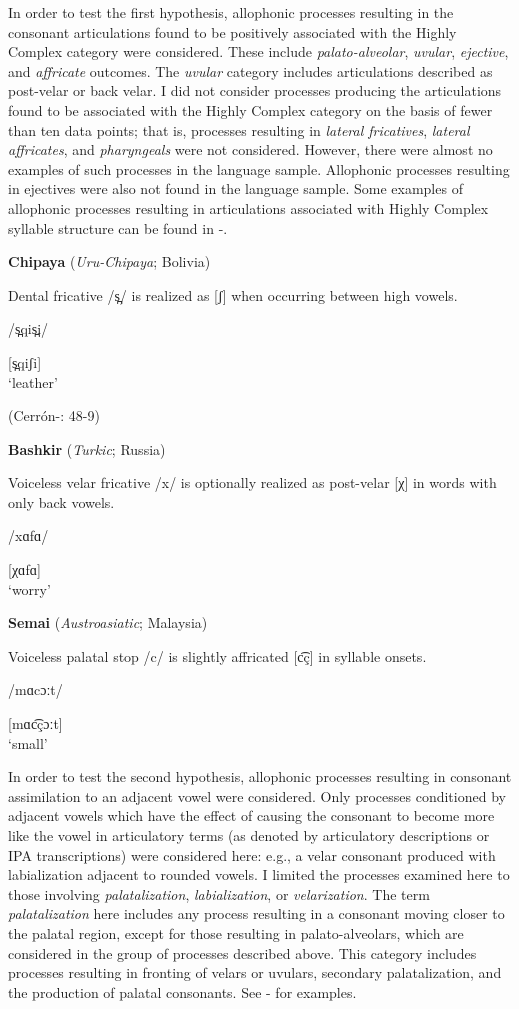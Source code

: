   In order to test the first hypothesis, allophonic processes resulting in the consonant articulations found to be positively associated with the Highly Complex category were considered. These include \textit{palato-alveolar}, \textit{uvular}, \textit{ejective}, and \textit{affricate} outcomes. The \textit{uvular} category includes articulations described as post-velar or back velar. I did not consider processes producing the articulations found to be associated with the Highly Complex category on the basis of fewer than ten data points; that is, processes resulting in \textit{lateral fricatives}, \textit{lateral affricates}, and \textit{pharyngeals} were not considered. However, there were almost no examples of such processes in the language sample. Allophonic processes resulting in ejectives were also not found in the language sample. Some examples of allophonic processes resulting in articulations associated with Highly Complex syllable structure can be found in -.

\ea\label{ex:7.3}
  \textbf{Chipaya} (\textit{Uru-Chipaya}; Bolivia)

Dental fricative /s̪/ is realized as [ʃ] when occurring between high vowels.

/s̪qis̪i/

[s̪qiʃi]\\
\glt ‘leather’

(Cerrón-\citealt{Palomino2006}: 48-9)
\z

\ea\label{ex:7.4}
  \textbf{Bashkir} (\textit{Turkic}; Russia)

Voiceless velar fricative /x/ is optionally realized as post-velar [χ] in words with only back vowels.

/xɑfɑ/

[χɑfɑ]\\
\glt ‘worry’
\citep[11]{Poppe1964}
\z

\ea\label{ex:7.5}
  \textbf{Semai} (\textit{Austroasiatic}; Malaysia)

Voiceless palatal stop /c/ is slightly affricated [c͡ç] in syllable onsets.

/mɑcɔːt/

[mɑc͡çɔːt]\\
\glt ‘small’
\citep[5]{Philips2007}
\z

  In order to test the second hypothesis, allophonic processes resulting in consonant assimilation to an adjacent vowel were considered. Only processes conditioned by adjacent vowels which have the effect of causing the consonant to become more like the vowel in articulatory terms (as denoted by articulatory descriptions or IPA transcriptions) were considered here: e.g., a velar consonant produced with labialization adjacent to rounded vowels. I limited the processes examined here to those involving \textit{palatalization}, \textit{labialization}, or \textit{velarization}. The term \textit{palatalization} here includes any process resulting in a consonant moving closer to the palatal region, except for those resulting in palato-alveolars, which are considered in the group of processes described above. This category includes processes resulting in fronting of velars or uvulars, secondary palatalization, and the production of palatal consonants. See - for examples.

